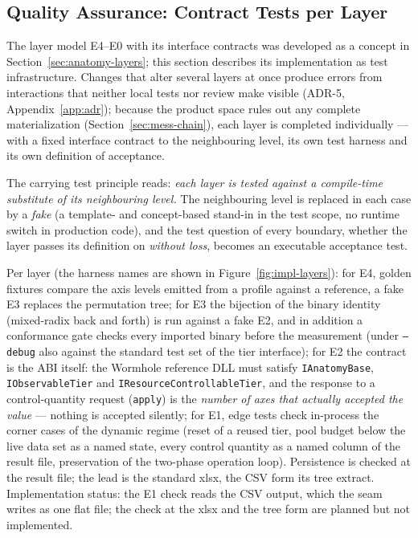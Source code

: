 \begin{nurkurz}
\section{Quality Assurance: Contract Tests per Layer}\label{sec:impl-contracts}
The layer model E4--E0 with its interface contracts was developed as a concept in
Section~\ref{sec:anatomy-layers}; this section describes its implementation as test infrastructure.
Changes that alter several layers at once produce errors from interactions that neither local tests nor
review make visible (ADR-5, Appendix~\ref{app:adr}); because the product space rules out any complete
materialization (Section~\ref{sec:mess-chain}), each layer is completed individually --- with a fixed
interface contract to the neighbouring level, its own test harness and its own definition of
acceptance.

The carrying test principle reads: \emph{each layer is tested against a compile-time substitute of its
neighbouring level.} The neighbouring level is replaced in each case by a \emph{fake} (a template- and
concept-based stand-in in the test scope, no runtime switch in production code), and the test question
of every boundary, whether the layer passes its definition on \emph{without loss}, becomes an
executable acceptance test.

Per layer (the harness names are shown in Figure~\ref{fig:impl-layers}): for E4, golden fixtures
compare the axis levels emitted from a profile against a reference, a fake E3 replaces the permutation
tree; for E3 the bijection of the binary identity (mixed-radix back and forth) is run against a fake
E2, and in addition a conformance gate checks every imported binary before the measurement (under
\texttt{--debug} also against the standard test set of the tier interface); for E2 the
contract is the ABI itself: the Wormhole reference DLL must satisfy \texttt{IAnatomyBase},
\texttt{IObservableTier} and \texttt{IResourceControllableTier}, and the response to a control-quantity
request (\texttt{apply}) is the \emph{number of axes that actually accepted the value} --- nothing is
accepted silently; for E1, edge tests check in-process the corner cases of the dynamic regime (reset of
a reused tier, pool budget below the live data set as a named state, every control quantity as a named
column of the result file, preservation of the two-phase operation loop). Persistence is checked at the
result file; the lead is the standard xlsx, the CSV form its tree extract. Implementation status: the
E1 check reads the CSV output, which the seam writes as one flat file; the check at the xlsx and the
tree form are planned but not implemented.


\end{nurkurz}
